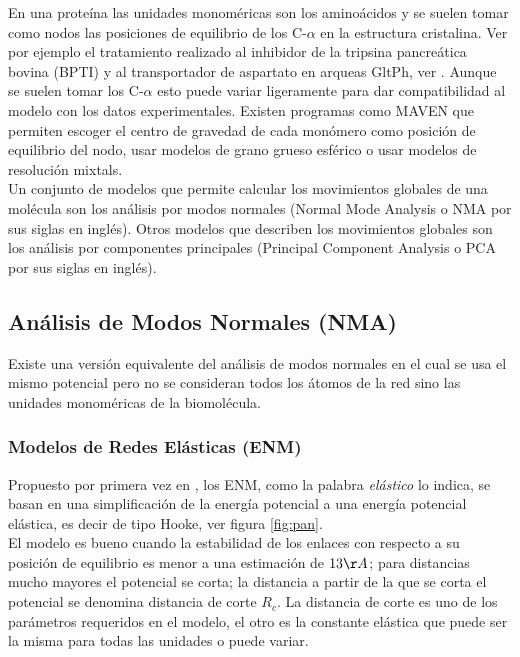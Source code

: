 En una prote\'{i}na las unidades monom\'{e}ricas son los amino\'{a}cidos y  se suelen tomar como nodos las posiciones de equilibrio de los C-$\alpha$ en la estructura cristalina. Ver por ejemplo el tratamiento realizado al inhibidor de la tripsina pancre\'{a}tica bovina (BPTI) y al transportador de aspartato en arqueas GltPh, ver \cite{Gur2013}. Aunque se suelen tomar los C-$\alpha$ esto puede variar ligeramente para dar compatibilidad al modelo con los datos experimentales. Existen programas como MAVEN \cite{Zimmermann2011} que permiten escoger el centro de gravedad de cada mon\'{o}mero como posici\'{o}n de equilibrio del nodo, usar modelos de grano grueso esf\'{e}rico o usar modelos de resoluci\'{o}n mixtals.\\
Un conjunto de modelos que permite calcular los movimientos globales de una mol\'{e}cula son los an\'{a}lisis por modos normales (Normal Mode Analysis o NMA por sus siglas en ingl\'{e}s).
 Otros modelos que describen los movimientos globales son los an\'{a}lisis por componentes principales (Principal Component Analysis o PCA por sus siglas en ingl\'{e}s).
 \subsection{An\'{a}lisis de Modos Normales (NMA)}
Existe una versi\'{o}n equivalente del an\'{a}lisis de modos normales en el cual se usa el mismo potencial pero no se consideran todos los \'{a}tomos de la red sino las unidades monom\'{e}ricas de la biomol\'{e}cula.
\subsubsection{Modelos de Redes El\'{a}sticas (ENM)}
Propuesto por primera vez en \cite{Tirion1996}, los ENM, como la palabra \textit{el\'{a}stico} lo indica, se basan en una simplificaci\'{o}n de la energ\'{i}a potencial a una energ\'{i}a potencial el\'{a}stica, es decir de tipo Hooke, ver figura \ref{fig:pan}.\\



El modelo es bueno cuando la estabilidad de los enlaces con respecto a su posici\'{o}n de equilibrio es menor a una estimaci\'{o}n  de $13\AA$; para distancias mucho mayores el potencial se corta; la distancia a partir de la que se corta el potencial se denomina distancia de corte $R_c$. La distancia de corte es uno de los par\'{a}metros requeridos en el modelo, el otro es la constante el\'{a}stica que puede ser la misma para todas las unidades o puede variar.\\

